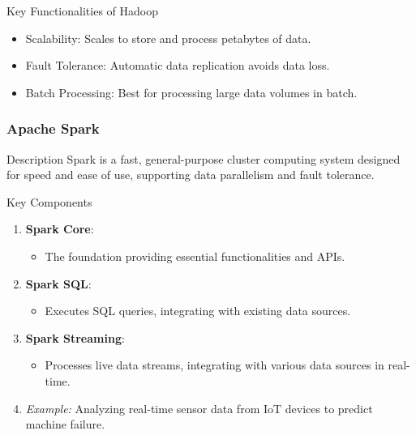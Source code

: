 \documentclass{beamer}
\begin{document}
\begin{frame}[fragile]
    \begin{block}{Key Functionalities of Hadoop}
        \begin{itemize}
            \item Scalability: Scales to store and process petabytes of data.
            \item Fault Tolerance: Automatic data replication avoids data loss.
            \item Batch Processing: Best for processing large data volumes in batch.
        \end{itemize}
    \end{block}
\end{frame}

\begin{frame}[fragile]
    \frametitle{Apache Spark}
    \begin{block}{Description}
        Spark is a fast, general-purpose cluster computing system designed for speed and ease of use, supporting data parallelism and fault tolerance.
    \end{block}

    \begin{block}{Key Components}
        \begin{enumerate}
            \item \textbf{Spark Core}:
                \begin{itemize}
                    \item The foundation providing essential functionalities and APIs.
                \end{itemize}
            \item \textbf{Spark SQL}:
                \begin{itemize}
                    \item Executes SQL queries, integrating with existing data sources.
                \end{itemize}
            \item \textbf{Spark Streaming}:
                \begin{itemize}
                    \item Processes live data streams, integrating with various data sources in real-time.
                \end{itemize}
            \item \textit{Example:} Analyzing real-time sensor data from IoT devices to predict machine failure.
        \end{enumerate}
    \end{block}


\end{frame}
\end{document}
